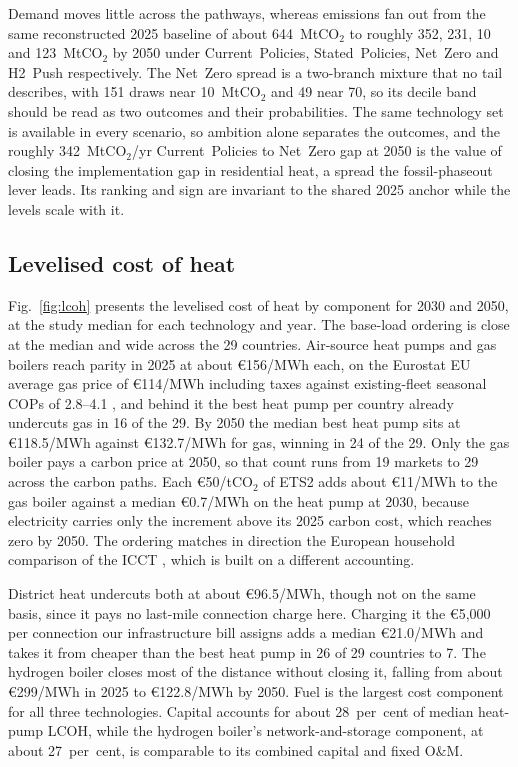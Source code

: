 Demand moves little across the pathways, whereas emissions fan out from the same reconstructed 2025 baseline of about 644~MtCO$_2$ to roughly 352, 231, 10 and 123~MtCO$_2$ by 2050 under Current~Policies, Stated~Policies, Net~Zero and H2~Push respectively. The Net~Zero spread is a two-branch mixture that no tail
describes, with 151 draws near 10~MtCO$_2$ and 49 near 70, so its decile band should be
read as two outcomes and their probabilities. The same technology set is available in every scenario, so ambition alone separates the
outcomes, and the roughly 342~MtCO$_2$/yr Current~Policies to Net~Zero gap at 2050 is the
value of closing the implementation gap in residential heat, a spread the fossil-phaseout
lever leads. Its ranking and sign are invariant to the shared 2025 anchor while the levels
scale with it.

\subsection{Levelised cost of heat}
\label{sec:results:lcoh}

Fig.~\ref{fig:lcoh} presents the levelised cost of heat by component for 2030 and 2050, at the study median for each technology and year. The base-load ordering is close at the median and wide across the 29 countries.
Air-source heat pumps and gas boilers reach parity in 2025 at about \euro{}156/MWh each,
on the Eurostat EU average gas price of \euro{}114/MWh including taxes
\citep{Eurostat2025gasprices} against existing-fleet seasonal COPs of 2.8--4.1 \citep{EHPA2023scop}, and behind it the best heat pump per country already undercuts gas in 16 of the 29. By 2050 the median best heat pump
sits at \euro{}118.5/MWh against \euro{}132.7/MWh for gas, winning in 24 of the 29. Only the gas boiler pays a carbon price at 2050, so that count runs from 19 markets to 29
across the carbon paths. Each \euro{}50/tCO$_2$ of ETS2 adds about \euro{}11/MWh to the gas boiler against a
median \euro{}0.7/MWh on the heat pump at 2030, because electricity carries only the
increment above its 2025 carbon cost, which reaches zero by 2050. The ordering matches in direction the European household comparison of the ICCT \citep{ICCT2023h2heating}, which is built on a different accounting.

District heat undercuts both at about \euro{}96.5/MWh, though not on the same basis, since
it pays no last-mile connection charge here. Charging it the
\euro{}5{,}000 per connection our infrastructure bill assigns adds a median
\euro{}21.0/MWh and takes it from cheaper than the best heat pump in 26 of 29 countries to
7. The hydrogen boiler closes most of the distance without closing it, falling from about \euro{}299/MWh in 2025 to \euro{}122.8/MWh by 2050. Fuel is the largest cost component for all
three technologies. Capital accounts for about 28~per~cent of median heat-pump LCOH,
while the hydrogen boiler's network-and-storage component, at about 27~per~cent, is
comparable to its combined capital and fixed O\&M.

